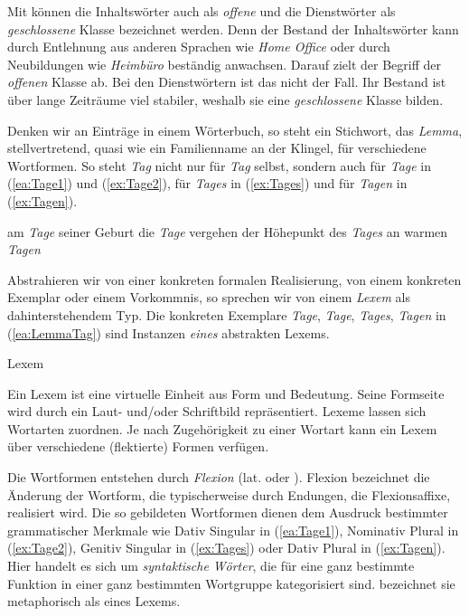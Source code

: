 Mit \citet[37]{Eisenberg2020_Wort} können die Inhaltswörter auch als \textit{offene} und die Dienstwörter als \textit{geschlossene} Klasse bezeichnet werden. Denn der Bestand der Inhaltswörter kann \zB durch Entlehnung aus anderen Sprachen wie \textit{Home Office} oder durch Neubildungen wie \textit{Heimbüro} beständig anwachsen. Darauf zielt der Begriff der \textit{offenen} Klasse ab. Bei den Dienstwörtern ist das nicht der Fall. Ihr Bestand ist über lange Zeiträume viel stabiler, weshalb sie eine \textit{geschlossene} Klasse bilden.

Denken wir an Einträge in einem Wörterbuch, so steht ein Stichwort, das \textit{Lemma}, stellvertretend, quasi wie ein Familienname an der Klingel, für verschiedene Wortformen. So steht \textit{Tag} nicht nur für \textit{Tag} selbst, sondern auch für \textit{Tage} in (\ref{ea:Tage1}) und (\ref{ex:Tage2}), für \textit{Tages} in (\ref{ex:Tages}) und für \textit{Tagen} in (\ref{ex:Tagen}).
 
\ea \label{ea:LemmaTag}
\ea \label{ea:Tage1} am \textit{Tage} seiner Geburt
\ex \label{ex:Tage2} die \textit{Tage} vergehen
\ex \label{ex:Tages} der Höhepunkt des \textit{Tages}
\ex \label{ex:Tagen} an warmen \textit{Tagen}
\z 
\z 

Abstrahieren wir von einer konkreten formalen Realisierung, von einem konkreten Exemplar oder einem Vorkommnis, so sprechen wir von einem \textit{Lexem} als dahinterstehendem Typ. Die konkreten Exemplare \textit{Tage}, \textit{Tage}, \textit{Tages}, \textit{Tagen} in (\ref{ea:LemmaTag}) sind Instanzen \textit{eines} abstrakten Lexems.     

\begin{Definition}{Lexem}\label{Def:Lexem}
    
\noindent Ein Lexem ist eine virtuelle Einheit aus Form und Bedeutung. Seine Formseite wird durch ein Laut- und/oder Schriftbild repräsentiert. Lexeme lassen sich Wortarten zuordnen. Je nach Zugehörigkeit zu einer Wortart kann ein Lexem über verschiedene (flektierte) Formen verfügen.  
\end{Definition}



Die Wortformen entstehen durch \textit{Flexion} (lat.  oder ). Flexion bezeichnet die Änderung der Wortform, die typischerweise durch Endungen, die Flexionsaffixe, realisiert wird. Die so gebildeten Wortformen dienen dem Ausdruck bestimmter grammatischer Merkmale wie Dativ Singular in (\ref{ea:Tage1}), Nominativ Plural in (\ref{ex:Tage2}), Genitiv Singular in (\ref{ex:Tages}) oder Dativ Plural in (\ref{ex:Tagen}). Hier handelt es sich um \textit{syntaktische Wörter}, die für eine ganz bestimmte Funktion in einer ganz bestimmten Wortgruppe kategorisiert sind. \citet[7]{Boettcher2009Wort} bezeichnet sie metaphorisch als  eines Lexems.


